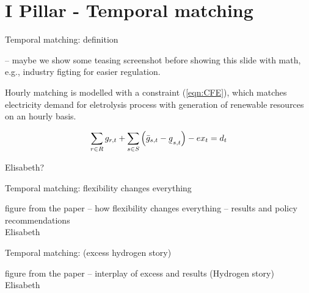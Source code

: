 \section{I Pillar - Temporal matching}
\begin{frame}{Temporal matching: definition}

  -- maybe we show some teasing screenshot before showing this slide with math, e.g., industry figting for easier regulation.

  \alert{Hourly matching} is modelled with a constraint (\ref{eqn:CFE}), 
  which matches electricity demand for eletrolysis process with generation of renewable resources on an hourly basis. 

  \vspace{0.1cm}
  \begin{equation}
  \sum_{r\in R} g_{r,t} + \sum_{s\in S} \left(\bar{g}_{s,t} - \ubar{g}_{s,t}\right) - ex_t = d_t
  \label{eqn:CFE}
  \end{equation}
  \vspace{0.1cm}
  
  \noindent{}

  Elisabeth?

\end{frame}


\begin{frame}{Temporal matching: flexibility changes everything}

  figure from the paper -- how flexibility changes everything -- results and policy recommendations
   \\
  Elisabeth

\end{frame}


\begin{frame}{Temporal matching: (excess hydrogen story)}

  figure from the paper -- interplay of excess and results (Hydrogen story)
   \\
  Elisabeth

\end{frame}



